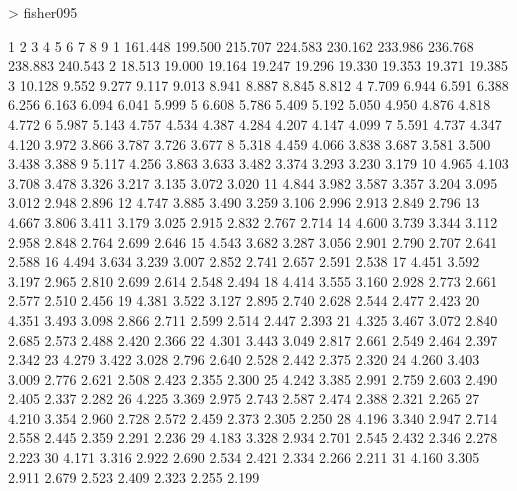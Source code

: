 \documentclass[onecolumn,11pt]{book}
\begin{document}
\begin{Schunk}
\begin{Sinput}
> fisher095
\end{Sinput}
\begin{Soutput}
          1       2       3       4       5       6       7       8       9
1   161.448 199.500 215.707 224.583 230.162 233.986 236.768 238.883 240.543
2    18.513  19.000  19.164  19.247  19.296  19.330  19.353  19.371  19.385
3    10.128   9.552   9.277   9.117   9.013   8.941   8.887   8.845   8.812
4     7.709   6.944   6.591   6.388   6.256   6.163   6.094   6.041   5.999
5     6.608   5.786   5.409   5.192   5.050   4.950   4.876   4.818   4.772
6     5.987   5.143   4.757   4.534   4.387   4.284   4.207   4.147   4.099
7     5.591   4.737   4.347   4.120   3.972   3.866   3.787   3.726   3.677
8     5.318   4.459   4.066   3.838   3.687   3.581   3.500   3.438   3.388
9     5.117   4.256   3.863   3.633   3.482   3.374   3.293   3.230   3.179
10    4.965   4.103   3.708   3.478   3.326   3.217   3.135   3.072   3.020
11    4.844   3.982   3.587   3.357   3.204   3.095   3.012   2.948   2.896
12    4.747   3.885   3.490   3.259   3.106   2.996   2.913   2.849   2.796
13    4.667   3.806   3.411   3.179   3.025   2.915   2.832   2.767   2.714
14    4.600   3.739   3.344   3.112   2.958   2.848   2.764   2.699   2.646
15    4.543   3.682   3.287   3.056   2.901   2.790   2.707   2.641   2.588
16    4.494   3.634   3.239   3.007   2.852   2.741   2.657   2.591   2.538
17    4.451   3.592   3.197   2.965   2.810   2.699   2.614   2.548   2.494
18    4.414   3.555   3.160   2.928   2.773   2.661   2.577   2.510   2.456
19    4.381   3.522   3.127   2.895   2.740   2.628   2.544   2.477   2.423
20    4.351   3.493   3.098   2.866   2.711   2.599   2.514   2.447   2.393
21    4.325   3.467   3.072   2.840   2.685   2.573   2.488   2.420   2.366
22    4.301   3.443   3.049   2.817   2.661   2.549   2.464   2.397   2.342
23    4.279   3.422   3.028   2.796   2.640   2.528   2.442   2.375   2.320
24    4.260   3.403   3.009   2.776   2.621   2.508   2.423   2.355   2.300
25    4.242   3.385   2.991   2.759   2.603   2.490   2.405   2.337   2.282
26    4.225   3.369   2.975   2.743   2.587   2.474   2.388   2.321   2.265
27    4.210   3.354   2.960   2.728   2.572   2.459   2.373   2.305   2.250
28    4.196   3.340   2.947   2.714   2.558   2.445   2.359   2.291   2.236
29    4.183   3.328   2.934   2.701   2.545   2.432   2.346   2.278   2.223
30    4.171   3.316   2.922   2.690   2.534   2.421   2.334   2.266   2.211
31    4.160   3.305   2.911   2.679   2.523   2.409   2.323   2.255   2.199

\end{Soutput}
\end{Schunk}
\end{document}
